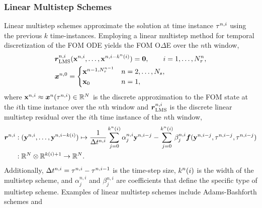 \subsubsection{Linear Multistep Schemes}
Linear multistep schemes approximate the solution at time instance $\tau^{n,i}$ using the previous $k$ time-instances.  
Employing a linear multistep method for temporal discretization of the FOM ODE yields the FOM O$\Delta$E over the $n$th window,
\begin{align*}
&\boldsymbol r_{\text{LMS}}^{n,i} ({\mathbf{x}}^{n,i},\ldots,{\mathbf{x}}^{n,i-k^n(i)}) = \boldsymbol 0, \qquad i=1,\ldots,N_{\tau}^{n}, \\
&\boldsymbol x^{n,0} = \begin{cases}
{\mathbf{x}}^{n-1,N_{\tau}^{n-1}} & n = 2,\ldots,N_s, \\
{{\mathbf{x}}_0} & n=1, \end{cases}
\end{align*}
where ${\mathbf{x}}^{n,i} \approx {\boldsymbol x}^{n}(\tau^{n,i}) \in \mathbb{R}^{N}$ is the discrete approximation to the FOM state at the $i$th time instance over the $n$th window and $\boldsymbol r_{\text{LMS}}^{n,i}$ is the discrete linear multistep residual over the $i$th time instance of the $n$th window,
\begin{align*}
\boldsymbol r^{n,i} &: (\mathbf{y}^{n,i},\ldots,\mathbf{y}^{n,i-k(i)}) \mapsto  \frac{1}{\Delta t^{n,i}} \sum_{j=0}^{k^{n}(i)} \alpha^{n,i}_j \mathbf{y}^{n,i-j} -  \sum_{j=0}^{k^{n}(i)} \beta^{n,i}_j \boldsymbol f(\mathbf{y}^{n,i-j},\tau^{n,i-j},\tau^{n,i-j}) \\
               &: \mathbb{R}^{N} \otimes \mathbb{R}^{k(i)+1} \rightarrow \mathbb{R}^{N}. 
\end{align*} 
Additionally, $\Delta t^{n,i} = \tau^{n,i} - \tau^{n,i-1}$ is the time-step size, $k^{n}(i)$ is the width of the multistep scheme, and $\alpha^{n,i}_j$ and $\beta^{n,i}_j$ are coefficients that 
define the specific type of multistep scheme. Examples of linear multistep schemes include Adams-Bashforth schemes and  
